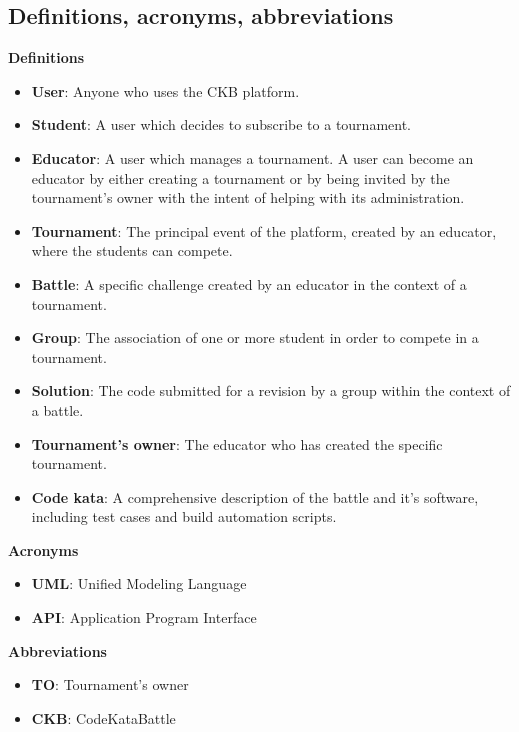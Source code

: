 \documentclass[../RASD.tex]{subfiles}
\begin{document}
    \subsection{Definitions, acronyms, abbreviations}
        \textbf{Definitions}
        \begin{itemize}
            \item {\textbf{User}: Anyone who uses the CKB platform.}
            \item {\textbf{Student}: A user which decides to subscribe to a tournament.}
            \item {\textbf{Educator}: A user which manages a tournament. A user can become an educator by either creating a tournament or by being invited by the tournament's owner with the intent of helping with its administration.}
            \item {\textbf{Tournament}: The principal event of the platform, created by an educator, where the students can compete.}
            \item {\textbf{Battle}: A specific challenge created by an educator in the context of a tournament.}
            \item {\textbf{Group}: The association of one or more student in order to compete in a tournament.}
            \item {\textbf{Solution}: The code submitted for a revision by a group within the context of a battle.}
            \item {\textbf{Tournament's owner}: The educator who has created the specific tournament.}
            \item {\textbf{Code kata}: A comprehensive description of the battle and it's software, including test cases and build automation scripts.}
        \end{itemize}
        \newpage
        \textbf{Acronyms}
        \begin{itemize}
            \item {\textbf{UML}: Unified Modeling Language}
            \item {\textbf{API}: Application Program Interface}
        \end{itemize}
        \textbf{Abbreviations}
        \begin{itemize}
            \item {\textbf{TO}: Tournament's owner}
            \item {\textbf{CKB}: CodeKataBattle}
        \end{itemize}
\end{document}
